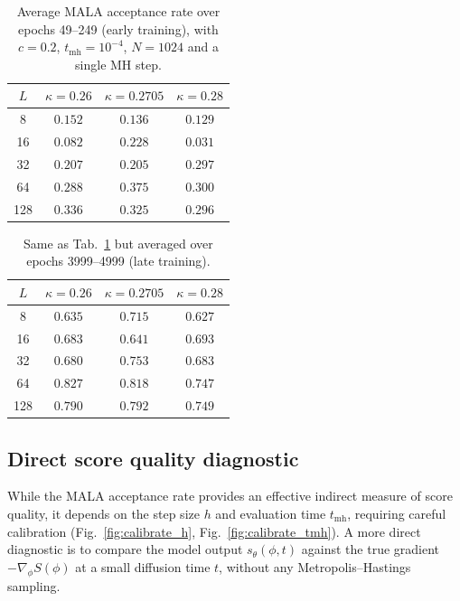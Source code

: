 \documentclass[reprint,twocolumn,superscriptaddress,preprintnumbers,amsmath,amssymb,aps,prd,floatfix]{revtex4-2}
\def\fig#1{Fig.~\ref{#1}}
\def\Tab#1{Tab.~\ref{#1}}
\begin{document}
\begin{table}[t]
\centering
\caption{Average MALA acceptance rate over epochs 49--249 (early training), with $c=0.2$, $t_{\text{mh}}=10^{-4}$, $N=1024$ and a single MH step.}
\label{tab:acc_early}
\begin{tabular}{cccc}
\toprule
$L$ & $\kappa=0.26$ & $\kappa=0.2705$ & $\kappa=0.28$ \\
\midrule
8   & $0.152$ & $0.136$ & $0.129$ \\
16  & $0.082$ & $0.228$ & $0.031$ \\
32  & $0.207$ & $0.205$ & $0.297$ \\
64  & $0.288$ & $0.375$ & $0.300$ \\
128 & $0.336$ & $0.325$ & $0.296$ \\
\bottomrule
\end{tabular}
\end{table}

\begin{table}[t]
\centering
\caption{Same as \Tab{tab:acc_early} but averaged over epochs 3999--4999 (late training).}
\label{tab:acc_late}
\begin{tabular}{cccc}
\toprule
$L$ & $\kappa=0.26$ & $\kappa=0.2705$ & $\kappa=0.28$ \\
\midrule
8   & $0.635$ & $0.715$ & $0.627$ \\
16  & $0.683$ & $0.641$ & $0.693$ \\
32  & $0.680$ & $0.753$ & $0.683$ \\
64  & $0.827$ & $0.818$ & $0.747$ \\
128 & $0.790$ & $0.792$ & $0.749$ \\
\bottomrule
\end{tabular}
\end{table}


\subsection{Direct score quality diagnostic}
\label{sec:score_quality}

While the MALA acceptance rate provides an effective indirect measure of score quality, it depends on the step size $h$ and evaluation time $t_{\text{mh}}$, requiring careful calibration (\fig{fig:calibrate_h}, \fig{fig:calibrate_tmh}).  A more direct diagnostic is to compare the model output $s_\theta(\phi,t)$ against the true gradient $-\nabla_\phi S(\phi)$ at a small diffusion time $t$, without any Metropolis--Hastings sampling.
\end{document}

